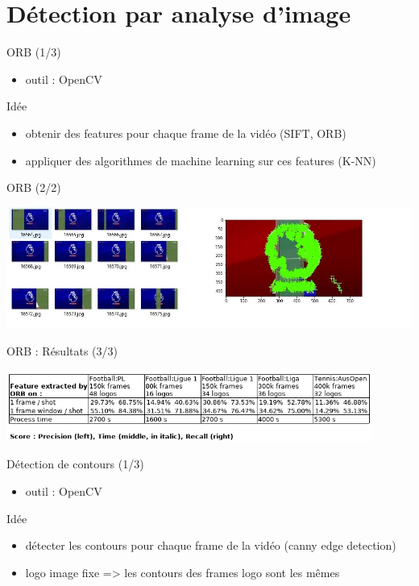\documentclass[presentation]{beamer}
\begin{document}
\section{Détection par analyse d'image}
\label{sec:org04ef24c}
\begin{frame}[label={sec:orgce105de}]{ORB (1/3)}
\begin{itemize}
\item outil : OpenCV
\end{itemize}
\begin{block}{Idée}
\begin{itemize}
\item obtenir des features pour chaque frame de la vidéo (SIFT, ORB)
\item appliquer des algorithmes de machine learning sur ces features (K-NN)
\end{itemize}
\end{block}
\end{frame}

\begin{frame}[label={sec:org43dcfca}]{ORB (2/2)}
\begin{center}
\includegraphics[width=.9\linewidth]{akaze_window_res2.jpg}
\end{center}
\end{frame}

\begin{frame}[label={sec:orgee2a7ca}]{ORB : Résultats (3/3)}
\begin{center}
\includegraphics[width=12cm]{res_orb.png}
\end{center}
\end{frame}

\begin{frame}[label={sec:org5f2ad5f}]{Détection de contours (1/3)}
\begin{itemize}
\item outil : OpenCV
\end{itemize}
\begin{block}{Idée}
\begin{itemize}
\item détecter les contours pour chaque frame de la vidéo (canny edge detection)
\item logo image fixe => les contours des frames logo sont les mêmes
\end{itemize}
\end{block}
\end{frame}
\end{document}
